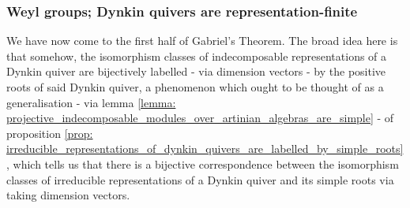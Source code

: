         \subsubsection{Weyl groups; Dynkin quivers are representation-finite}
            We have now come to the first half of Gabriel's Theorem. The broad idea here is that somehow, the isomorphism classes of indecomposable representations of a Dynkin quiver are bijectively labelled - via dimension vectors - by the positive roots of said Dynkin quiver, a phenomenon which ought to be thought of as a generalisation - via lemma \ref{lemma: projective_indecomposable_modules_over_artinian_algebras_are_simple} - of proposition \ref{prop: irreducible_representations_of_dynkin_quivers_are_labelled_by_simple_roots}, which tells us that there is a bijective correspondence between the isomorphism classes of irreducible representations of a Dynkin quiver and its simple roots via taking dimension vectors. 
            
